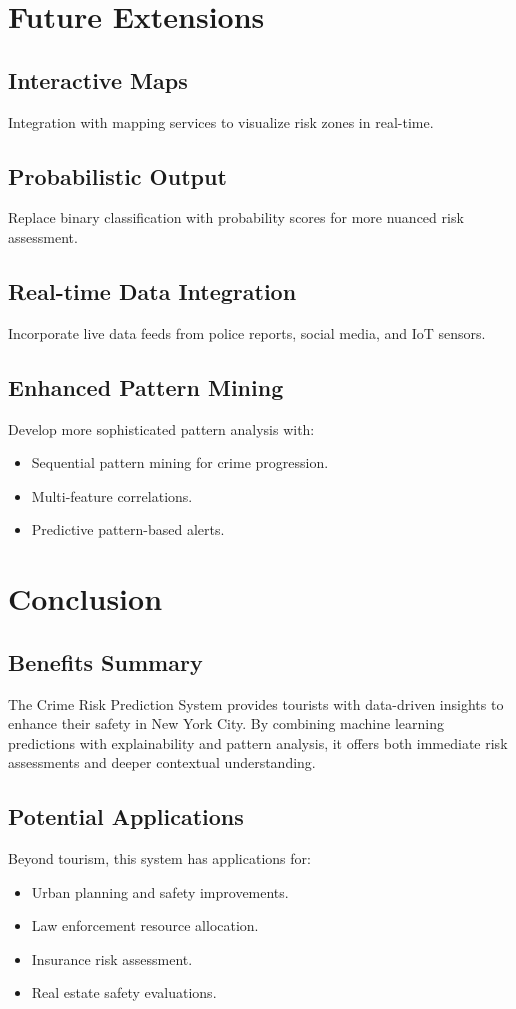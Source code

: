 \documentclass{article}
\begin{document}
\section{Future Extensions}

\subsection{Interactive Maps}
Integration with mapping services to visualize risk zones in real-time.

\subsection{Probabilistic Output}
Replace binary classification with probability scores for more nuanced risk assessment.

\subsection{Real-time Data Integration}
Incorporate live data feeds from police reports, social media, and IoT sensors.

\subsection{Enhanced Pattern Mining}
Develop more sophisticated pattern analysis with:
\begin{itemize}
\item Sequential pattern mining for crime progression.
\item Multi-feature correlations.
\item Predictive pattern-based alerts.
\end{itemize}

\section{Conclusion}

\subsection{Benefits Summary}
The Crime Risk Prediction System provides tourists with data-driven insights to enhance their safety in New York City. By combining machine learning predictions with explainability and pattern analysis, it offers both immediate risk assessments and deeper contextual understanding.

\subsection{Potential Applications}
Beyond tourism, this system has applications for:
\begin{itemize}
\item Urban planning and safety improvements.
\item Law enforcement resource allocation.
\item Insurance risk assessment.
\item Real estate safety evaluations.
\end{itemize}
\end{document}
